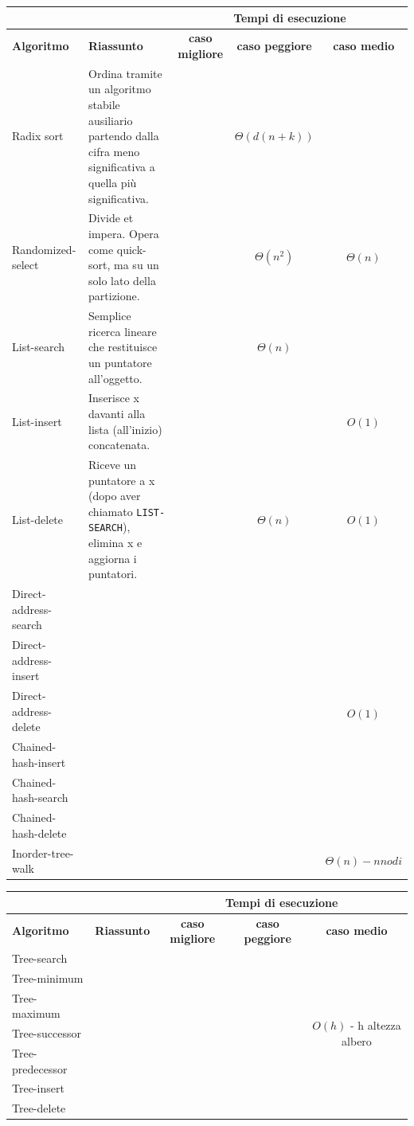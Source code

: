\documentclass[11pt,a4paper]{article}
\begin{document}
\begin{sideways}
  \begin{tabularx}{550pt}{l|X|c|c|c}
    \multicolumn{2}{c}{\ } & \multicolumn{3}{c}{\textbf{Tempi di esecuzione}}\\
    \hline
    \textbf{Algoritmo} & \textbf{Riassunto} & \textbf{caso migliore} & \textbf{caso peggiore} & \textbf{caso medio}\\
    \hline
    Radix sort &
    Ordina tramite un algoritmo stabile ausiliario
    partendo dalla cifra meno significativa a
    quella più significativa. & &
    $\Theta(d(n+k))$ \\
    \hline
    Randomized-select &
    Divide et impera. Opera come quick-sort, ma
    su un solo lato della partizione. & &
    $\Theta(n^2)$ &
    $\Theta(n)$\\
    \hline
    List-search &
    Semplice ricerca lineare che restituisce un
    puntatore all’oggetto. & &
    $\Theta(n)$\\
    \hline
    List-insert &
    Inserisce x davanti alla lista (all’inizio)
    concatenata. & & &
    $O(1)$\\
    \hline
    List-delete &
    Riceve un puntatore a x (dopo aver chiamato
    \texttt{LIST-SEARCH}), elimina x e aggiorna i
    puntatori. & &
    $\Theta(n)$ &
    $O(1)$ \\
    \hline
    Direct-address-search & & & & \multirow{6}{*}{$O(1)$}\\
    Direct-address-insert & & & &\\
    Direct-address-delete & & & &\\
    Chained-hash-insert& & & &\\
    Chained-hash-search& & & &\\
    Chained-hash-delete& & & &\\
    \hline
    Inorder-tree-walk & & & & $\Theta(n) - n nodi$
  \end{tabularx}
\end{sideways}

\begin{sideways}
  \begin{tabularx}{550pt}{l|X|c|c|c}
    \multicolumn{2}{c}{\ } & \multicolumn{3}{c}{\textbf{Tempi di esecuzione}}\\
    \hline
    \textbf{Algoritmo} & \textbf{Riassunto} & \textbf{caso migliore} & \textbf{caso peggiore} & \textbf{caso medio}\\
    \hline
    Tree-search & & & & \multirow{7}{*}{$O(h)$ - h altezza albero}\\
    Tree-minimum & & & & \\
    Tree-maximum & & & & \\
    Tree-successor & & & & \\
    Tree-predecessor & & & & \\
    Tree-insert & & & & \\
    Tree-delete & & & & \\
  \end{tabularx}
\end{sideways}



\end{document}
